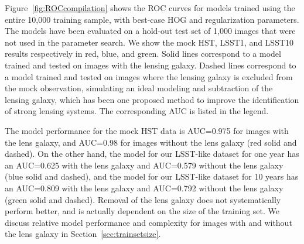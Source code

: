 \documentclass{emulateapj}
\begin{document}
Figure~\ref{fig:ROCcompilation} shows the ROC curves for models
trained using the entire 10,000 training sample, with best-case HOG
and regularization parameters.  The models have been evaluated on a
hold-out test set of 1,000 images that were not used in the parameter
search.  We show the mock HST, LSST1, and LSST10 results respectively
in red, blue, and green.  Solid lines correspond to a model trained
and tested on images with the lensing galaxy.  Dashed lines correspond
to a model trained and tested on images where the lensing galaxy is
excluded from the mock observation, simulating an ideal modeling and
subtraction of the lensing galaxy, which has been one proposed method
to improve the identification of strong lensing systems.  The
corresponding AUC is listed in the legend.

The model performance for the mock HST data is AUC=0.975 for images
with the lens galaxy, and AUC=0.98 for images without the lens galaxy
(red solid and dashed).  On the other hand, the model for our
LSST-like dataset for one year has an AUC=0.625 with the lens galaxy
and AUC=0.579 without the lens galaxy (blue solid and dashed), and the
model for our LSST-like dataset for 10 years has an AUC=0.809 with the
lens galaxy and AUC=0.792 without the lens galaxy (green solid and
dashed).  Removal of the lens galaxy does not systematically perform
better, and is actually dependent on the size of the training set.  We
discuss relative model performance and complexity for images with and
without the lens galaxy in Section~\ref{sec:trainsetsize}.  
\end{document}
